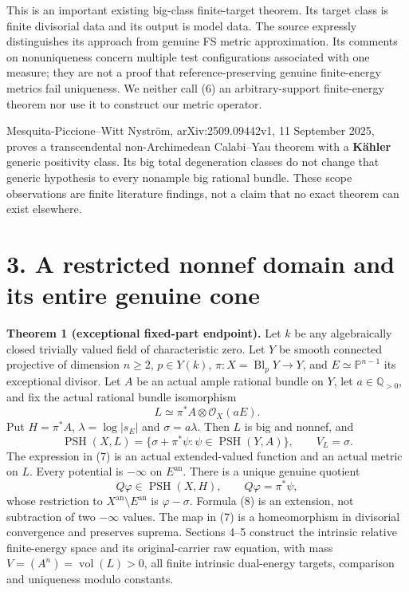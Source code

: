 \documentclass[
  10pt,
]{article}
\begin{document}
This is an important existing big-class finite-target theorem. Its
target class is finite divisorial data and its output is model data. The
source expressly distinguishes its approach from genuine FS metric
approximation. Its comments on nonuniqueness concern multiple test
configurations associated with one measure; they are not a proof that
reference-preserving genuine finite-energy metrics fail uniqueness. We
neither call (6) an arbitrary-support finite-energy theorem nor use it
to construct our metric operator.

Mesquita-Piccione--Witt Nyström, arXiv:2509.09442v1, 11 September 2025,
proves a transcendental non-Archimedean Calabi--Yau theorem with a
\textbf{Kähler} generic positivity class. Its big total degeneration
classes do not change that generic hypothesis to every nonample big
rational bundle. These scope observations are finite literature
findings, not a claim that no exact theorem can exist elsewhere.

\section{3. A restricted nonnef domain and its entire genuine
cone}\label{a-restricted-nonnef-domain-and-its-entire-genuine-cone}

\textbf{Theorem 1 (exceptional fixed-part endpoint).} Let \(k\) be any
algebraically closed trivially valued field of characteristic zero. Let
\(Y\) be smooth connected projective of dimension \(n\ge2\),
\(p\in Y(k)\), \(\pi:X=\operatorname{Bl}_pY\to Y\), and
\(E\simeq\mathbb P^{n-1}\) its exceptional divisor. Let \(A\) be an
actual ample rational bundle on \(Y\), let \(a\in\mathbb Q_{>0}\), and
fix the actual rational bundle isomorphism
\[ L\simeq\pi^*A\otimes\mathcal O_X(aE). \] Put \(H=\pi^*A\),
\(\lambda=\log|s_E|\) and \(\sigma=a\lambda\). Then \(L\) is big and
nonnef, and \[
 \operatorname{PSH}(X,L)
   =\{\sigma+\pi^*\psi:\psi\in\operatorname{PSH}(Y,A)\},
 \qquad V_L=\sigma.
 \tag{7}
\] The expression in (7) is an actual extended-valued function and an
actual metric on \(L\). Every potential is \(-\infty\) on
\(E^{\mathrm{an}}\). There is a unique genuine quotient
\[ Q\varphi\in\operatorname{PSH}(X,H),\qquad
 Q\varphi=\pi^*\psi,
 \tag{8}
\] whose restriction to \(X^{\mathrm{an}}\setminus E^{\mathrm{an}}\) is
\(\varphi-\sigma\). Formula (8) is an extension, not subtraction of two
\(-\infty\) values. The map in (7) is a homeomorphism in divisorial
convergence and preserves suprema. Sections 4--5 construct the intrinsic
relative finite-energy space and its original-carrier raw equation, with
mass \(V=(A^n)=\operatorname{vol}(L)>0\), all finite intrinsic
dual-energy targets, comparison and uniqueness modulo constants.
\end{document}
